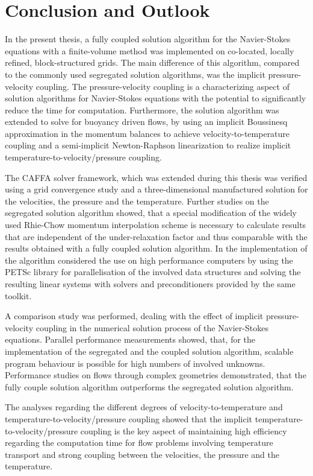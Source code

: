 \section{Conclusion and Outlook}
\label{sec:conclusion}

In the present thesis, a fully coupled solution algorithm for the Navier-Stokes equations with a finite-volume method was implemented on co-located, locally refined, block-structured grids. The main difference of this algorithm, compared to the commonly used segregated solution algorithms, was the implicit pressure-velocity coupling. The pressure-velocity coupling is a characterizing aspect of solution algorithms for Navier-Stokes equations with the potential to significantly reduce the time for computation. Furthermore, the solution algorithm was extended to solve for buoyancy driven flows, by using an implicit Boussinesq approximation in the momentum balances to achieve velocity-to-temperature coupling and a semi-implicit Newton-Raphson linearization to realize implicit temperature-to-velocity/pressure coupling.

The CAFFA solver framework, which was extended during this thesis was verified using a grid convergence study and a three-dimensional manufactured solution for the velocities, the pressure and the temperature. Further studies on the segregated solution algorithm showed, that a special modification of the widely used Rhie-Chow momentum interpolation scheme is necessary to calculate results that are independent of the under-relaxation factor and thus comparable with the results obtained with a fully coupled solution algorithm. In the implementation of the algorithm considered the  use on high performance computers by using the PETSc library for parallelisation of the involved data structures and solving the resulting linear systems with solvers and preconditioners provided by the same toolkit.

A comparison study was performed, dealing with the effect of implicit pressure-velocity coupling in the numerical solution process of the Navier-Stokes equations. Parallel performance measurements showed, that, for the implementation of the segregated and the coupled solution algorithm, scalable program behaviour is possible for high numbers of involved unknowns. Performance studies on flows through complex geometries demonstrated, that the fully couple solution algorithm outperforms the segregated solution algorithm. 

The analyses regarding the different degrees of velocity-to-temperature and temperature-to-velocity/pressure coupling showed that the implicit temperature-to-velocity/pressure coupling is the key aspect of maintaining high efficiency regarding the computation time for flow problems involving temperature transport and strong coupling between the velocities, the pressure and the temperature.

